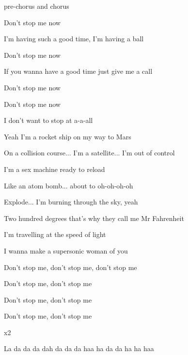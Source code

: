 \begin{song}
\begin{chorusbox}{pre-chorus and chorus}
\bigskip

Don’t stop me now \par
I’m having such a good time, I’m having a ball \par
{}Don’t stop me now \par
If you wanna have a good time just give me a call \par
{}Don’t stop me now \par
\hspace{120pt}  \par
{}Don’t stop me now \par
\hspace{120pt}  \par
I don’t want to stop at a-a-all
\end{chorusbox}

\bigskip

Yeah I’m a rocket ship on my way to Mars \par
On a collision course... I’m a satellite... I’m out of control \par
I’m a sex machine ready to reload \par
Like an atom bomb... about to oh-oh-oh-oh \par

\bigskip

Explode... I’m burning through the sky, yeah \par
Two hundred degrees that’s why they call me Mr Fahrenheit \par
I’m travelling at the speed of light \par
I wanna make a supersonic woman of you \par

\bigskip

 \par
Don’t stop me, don’t stop me, don’t stop me  \par
Don’t stop me, don’t stop me  \par
Don’t stop me, don’t stop me  \par
Don’t stop me, don’t stop me  \par
{}     x2 \par

\bigskip

 \par

\bigskip

 La da da da dah da da da haa ha da da ha ha haa  \par

\end{song}
